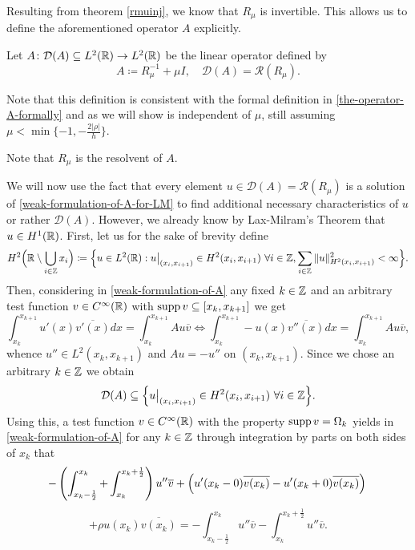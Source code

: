Resulting from theorem \ref{rmuinj}, we know that $R_{\mu}$ is invertible. This allows us to define the aforementioned operator $A$ explicitly.
\begin{definition}
	Let $A \colon \mathcal{D}(A) \subseteq L^{2}(\mathbb{R}) \rightarrow L^{2}(\mathbb{R})$ be the linear operator defined by
	\[ A \coloneqq R_{\mu}^{-1} + \mu I, \quad \mathcal{D}(A) = \mathcal{R}(R_{\mu}). \]
\end{definition}
Note that this definition is consistent with the formal definition in \eqref{the-operator-A-formally} and as we will show is independent of $\mu$, still assuming $\mu < \min \{ -1, - \frac{2|\rho|}{h} \}$. 
\begin{remark}
	Note that $R_{\mu}$ is the resolvent of $A$.
\end{remark}
We will now use the fact that every element $u \in \mathcal{D}(A) = \mathcal{R}(R_{\mu})$ is a solution of \eqref{weak-formulation-of-A-for-LM} to find additional necessary  characteristics of $u$ or rather $\mathcal{D}(A)$. However, we already know by Lax-Milram's Theorem that $u \in H^{1}(\mathbb{R})$. First, let us for the sake of brevity define
\[ H^{2}\Big(\mathbb{R} \setminus \bigcup_{i \in \mathbb{Z}} x_{i} \Big) \coloneqq \Big\{ u\in L^{2}(\mathbb{R}) : u\big|_{(x_{i}, x_{i+1})} \in H^{2}(x_{i}, x_{i+1}) ~\forall i \in \mathbb{Z}, \sum_{i \in \mathbb{Z}} \|u\|^{2}_{H^{2}(x_{i}, x_{i+1})} < \infty \Big\}. \]
Then, considering in \eqref{weak-formulation-of-A} any fixed $k \in \mathbb{Z}$ and an arbitrary test function $v \in C^{\infty}(\mathbb{R})$ with $\operatorname{supp} v \subseteq [x_{k}, x_{k+1}]$ we get 
	\begin{equation}
		\int_{x_{k}}^{x_{k + 1}} u'(x) \overline{v'(x)} dx = \int_{x_{k}}^{x_{k+1}} A u  \overline{v} \iff \int_{x_{k}}^{x_{k+1}} - u(x) \overline{v''(x)} dx = \int_{x_{k}}^{x_{k+1}} A u \overline{v}, \label{temp-link}
	\end{equation} 
whence $u'' \in L^{2}(x_{k}, x_{k + 1})$ and $A u = - u''$ on $(x_{k}, x_{k + 1})$. Since we chose an arbitrary $k \in \mathbb{Z}$ we obtain 
	$$ \mathcal{D}(A) \subseteq \Big\{ u\big|_{(x_{i}, x_{i+1})} \in H^{2}(x_{i}, x_{i+1}) ~\forall i \in \mathbb{Z} \Big\}. $$
Using this, a test function $v \in C^{\infty}(\mathbb{R})$ with the property $\operatorname{supp} v = \Omega_{k}$ yields in \eqref{weak-formulation-of-A} for any $k \in \mathbb{Z}$ through integration by parts on both sides of $x_{k}$ that
	\[ -\left( \int_{x_{k}-\frac{1}{2}}^{x_{k}} + \int_{x_{k}}^{x_{k} + \frac{1}{2}}\right) u'' \overline{v} + \left( u'(x_{k}-0) \overline{v(x_{k})} - u'(x_{k} + 0) \overline{v(x_{k})} \right) \\ \]
	\[ +  \rho u(x_{k})\overline{v(x_{k})} = - \int_{x_{k} - \frac{1}{2}}^{x_{k}} u'' \overline{v} - \int_{x_{k}}^{x_{k} + \frac{1}{2}} u'' \overline{v}. \]
